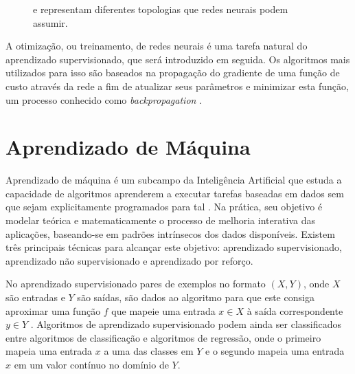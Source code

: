 \begin{figure}[ht]
 \centering
   \qquad
   \captionsetup{width=1\textwidth}
   \caption{{} e {} representam diferentes topologias que redes neurais podem assumir.}
  \label{fig:topologies}
\end{figure}


A otimização, ou treinamento, de redes neurais é uma tarefa natural do aprendizado supervisionado, que será introduzido em seguida. Os algoritmos mais utilizados para isso são baseados na propagação do gradiente de uma função de custo através da rede a fim de atualizar seus parâmetros e minimizar esta função, um processo conhecido como \textit{backpropagation} \cite{Goodfellow2016}.


\section{Aprendizado de Máquina}
\label{sec:aprendizadomaquina}

Aprendizado de máquina é um subcampo da Inteligência Artificial que estuda a capacidade de algoritmos aprenderem a executar tarefas baseadas em dados sem que sejam explicitamente programados para tal \cite{Simon2013TooBT}. Na prática, seu objetivo é modelar teórica e matematicamente o processo de melhoria interativa das aplicações, baseando-se em padrões intrínsecos dos dados disponíveis. Existem três principais técnicas para alcançar este objetivo: aprendizado supervisionado, aprendizado não supervisionado e aprendizado por reforço. 

No aprendizado supervisionado pares de exemplos no formato $(X, Y)$, onde $X$ são entradas e $Y$ são saídas, são dados ao algoritmo para que este consiga aproximar uma função $f$ que mapeie uma entrada $x \in X$ à saída correspondente $y \in Y$ \cite{Russel}. Algoritmos de aprendizado supervisionado podem ainda ser classificados entre algoritmos de classificação e algoritmos de regressão, onde o primeiro mapeia uma entrada $x$ a uma das classes em $Y$ e o segundo mapeia uma entrada $x$ em um valor contínuo no domínio de $Y$.

